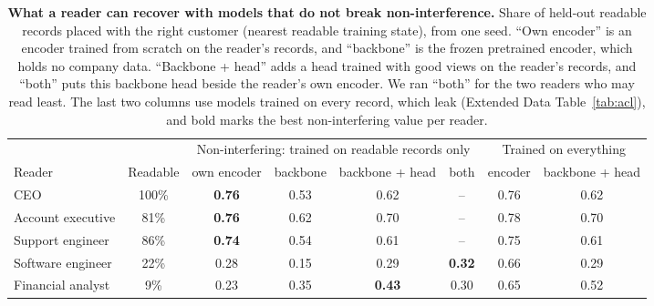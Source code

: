 \documentclass[11pt]{article}
\begin{document}
\begin{table}[h]
\centering
\small
\caption{\textbf{What a reader can recover with models that do not break non-interference.} Share of held-out readable records placed with the right customer (nearest readable training state), from one seed. ``Own encoder'' is an encoder trained from scratch on the reader's records, and ``backbone'' is the frozen pretrained encoder, which holds no company data. ``Backbone + head'' adds a head trained with good views on the reader's records, and ``both'' puts this backbone head beside the reader's own encoder. We ran ``both'' for the two readers who may read least. The last two columns use models trained on every record, which leak (Extended Data Table~\ref{tab:acl}), and bold marks the best non-interfering value per reader.}
\label{tab:aclrescue}
\setlength{\tabcolsep}{3.5pt}\begin{tabular}{lccccccc}
\toprule
& & \multicolumn{4}{c}{Non-interfering: trained on readable records only} & \multicolumn{2}{c}{Trained on everything} \\
\cmidrule(lr){3-6}\cmidrule(lr){7-8}
Reader & Readable & own encoder & backbone & backbone + head & both & encoder & backbone + head \\
\midrule
CEO & 100\% & \textbf{0.76} & 0.53 & 0.62 & -- & 0.76 & 0.62 \\
Account executive & 81\% & \textbf{0.76} & 0.62 & 0.70 & -- & 0.78 & 0.70 \\
Support engineer & 86\% & \textbf{0.74} & 0.54 & 0.61 & -- & 0.75 & 0.61 \\
Software engineer & 22\% & 0.28 & 0.15 & 0.29 & \textbf{0.32} & 0.66 & 0.29 \\
Financial analyst & 9\% & 0.23 & 0.35 & \textbf{0.43} & 0.30 & 0.65 & 0.52 \\
\bottomrule
\end{tabular}
\end{table}
\end{document}
